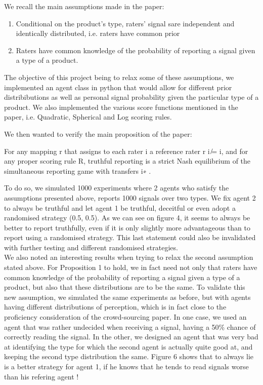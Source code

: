 \documentclass{scrartcl}
\begin{document}
We recall the main assumptions made in the paper:

\begin{enumerate}
\item Conditional on the product’s type, raters’ signal sare independent and identically distributed, i.e. raters have common prior
\item Raters have common knowledge of the probability of reporting a signal given a type of a product.
\end{enumerate}

The objective of this project being to relax some of these assumptions, we implemented an agent class in python that would allow for different prior distribibutions as well as personal signal probability given the particular type of a product. We also implemented the various score functions mentioned in the paper, i.e. Quadratic, Spherical and Log scoring rules.

We then wanted to verify the main proposition of the paper:

\begin{displayquote}
For any mapping r that assigns to each rater i a reference rater r i  ̸= i, and for any proper scoring rule R, truthful reporting is a strict Nash equilibrium of the simultaneous reporting game with transfers  i∗ .
\end{displayquote}

To do so, we simulated 1000 experiments where 2 agents who satisfy the assumptions presented above, reports 1000 signals over two types. We fix agent 2 to always be truthful and let agent 1 be truthful, deceitful or even adopt a randomised strategy (0.5, 0.5). As we can see on figure 4, it seems to always be better to report truthfully, even if it is only slightly more advantageous than to report using a randomised strategy. This last statement could also be invalidated with further testing and different randomised strategies.\\

We also noted an interesting results when trying to relax the second assumption stated above. For Proposition 1 to hold, we in fact need not only that  raters have common knowledge of the probability of reporting a signal given a type of a product, but also that these distributions are to be the same. To validate this new assumption, we simulated the same experiments as before, but with agents having different distributions of perception, which is in fact close to the proficiency consideration of the crowd-sourcing paper. In one case, we used an agent that was rather undecided when receiving a signal, having a 50\% chance of correctly reading the signal. In the other, we designed an agent that was very bad at identifying the type for which the second agent is actually quite good at, and keeping the second type distribution the same. Figure 6 shows that to always lie is a better strategy for agent 1, if he knows that he tends to read signals worse than his refering agent !\\ 
\end{document}
